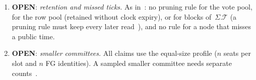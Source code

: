 \documentclass{article}
\theoremstyle{plain}
\theoremstyle{definition}
\theoremstyle{remark}
\newcommand{\T}{\mathcal T}
\newcommand{\SAS}{\cite{SAS}}
\newcommand{\FAST}[1]{\cite[\S#1]{FAST}}
\newcommand{\OPEN}{\textbf{OPEN}}
\begin{document}
\begin{enumerate}[leftmargin=*]
  available-chain merge \texttt{1a3f73a} puts the SA, Grid~CO, and SA-PC
  theorems on the receipt premise; the public theorems keep their
  statements~\cite[\S9]{RR}.  The plain SA base has no FG, so the
  filtered base does not change it~\cite[\S1]{FB}.
\item \OPEN: \emph{retention and missed ticks.}  As in~\SAS: no pruning
  rule for the vote pool, for the row pool (retained without clock expiry), or for blocks of~$\Sigma.\T$ (a pruning rule must keep every later read~\cite[M1]{FR}), and
  no rule for a node that misses a public time.
\item \OPEN: \emph{smaller committees.}  All claims use the equal-size
  profile ($n$ seats per slot and $n$ FG identities).  A sampled smaller
  committee needs separate counts~\FAST{1}.
\end{enumerate}
\end{document}
